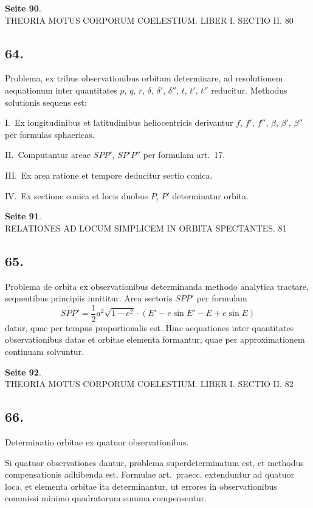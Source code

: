 \documentclass[12pt,a4paper]{article}
\begin{document}
\textbf{Seite 90}.\\
THEORIA MOTUS CORPORUM COELESTIUM. LIBER I. SECTIO II. 80

\subsection*{64.}

Problema, ex tribus observationibus orbitam determinare, ad resolutionem aequationum inter quantitates $p$, $q$, $r$, $\delta$, $\delta'$, $\delta''$, $t$, $t'$, $t''$ reducitur. Methodus solutionis sequens est:

I.~Ex longitudinibus et latitudinibus heliocentricis derivantur $f$, $f'$, $f''$, $\beta$, $\beta'$, $\beta''$ per formulas sphaericas.

II.~Computantur areae $SPP'$, $SP'P''$ per formulam art.~17.

III.~Ex area ratione et tempore deducitur sectio conica.

IV.~Ex sectione conica et locis duobus $P$, $P'$ determinatur orbita.

\textbf{Seite 91}.\\
RELATIONES AD LOCUM SIMPLICEM IN ORBITA SPECTANTES. 81

\subsection*{65.}

Problema de orbita ex observationibus determinanda methodo analytica tractare, sequentibus principiis innititur. Area sectoris $SPP'$ per formulam
\[
SPP' = \frac{1}{2} a^2 \sqrt{1-e^2} \cdot (E' - e \sin E' - E + e \sin E)
\]
datur, quae per tempus proportionalis est. Hinc aequationes inter quantitates observationibus datas et orbitae elementa formantur, quae per approximationem continuam solvuntur.

\textbf{Seite 92}.\\
THEORIA MOTUS CORPORUM COELESTIUM. LIBER I. SECTIO II. 82

\subsection*{66.}

Determinatio orbitae ex quatuor observationibus.

Si quatuor observationes dantur, problema superdeterminatum est, et methodus compensationis adhibenda est. Formulae art.~praecc. extenduntur ad quatuor loca, et elementa orbitae ita determinantur, ut errores in observationibus commissi minimo quadratorum summa compensentur.
\end{document}
